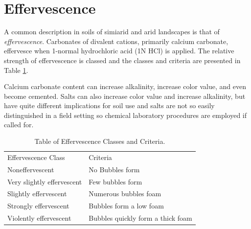 \documentclass{article}
\begin{document}

 
 \section{Effervescence}
 \label{effervescence}
 

A common description in soils of simiarid and arid landscapes is that of \textit{effervescence}. Carbonates of divalent cations, primarily calcium carbonate, effervesce when 1-normal hydrochloric acid (1N HCl) is applied. The relative strength of effervescence is classed and the classes and criteria are presented in Table \ref{tab:effervescenceclasses}.

Calcium carbonate content can increase alkalinity, increase color value, and even become cemented. Salts can also increase color value and increase alkalinity, but have quite different implications for soil use and salts are not so easily distinguished in a field setting so chemical laboratory procedures are employed if called for.

\begin{table}[!htbp]
\centering
\caption{Table of Effervescence Classes and Criteria.}
\label{tab:effervescenceclasses}
\begin{tabular}{ll}
\hline
Effervescence Class         & Criteria                          \\ \hhline{==}
Noneffervescent             & No Bubbles form                   \\
Very slightly effervescent  & Few bubbles form                  \\
Slightly effervescent       & Numerous bubbles foam             \\
Strongly effervescent       & Bubbles form a low foam           \\
Violently effervescent      & Bubbles quickly form a thick foam \\
\hline
\end{tabular}
\end{table}
\end{document}
